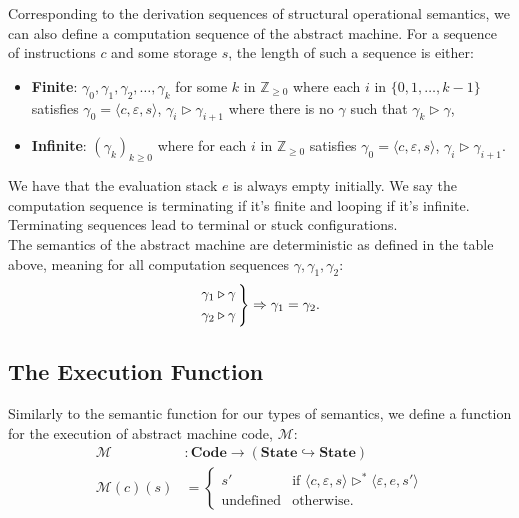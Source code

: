 Corresponding to the derivation sequences of structural operational semantics,
we can also define a computation sequence of the abstract machine. For a 
sequence of instructions $c$ and some storage $s$, the length of such a sequence 
is either: \begin{itemize}
  \item \textbf{Finite}: $\gamma_0, \gamma_1, \gamma_2, \ldots, \gamma_k$
  for some $k$ in $\mathbb{Z}_{\geq 0}$ where each $i$ in $\{0, 1, \ldots, k - 1\}$ satisfies
  $\gamma_0 = \langle c, \varepsilon, s \rangle$, $\gamma_i \triangleright \gamma_{i + 1}$ where
  there is no $\gamma$ such that $\gamma_k \triangleright \gamma$,
  \item \textbf{Infinite}: $(\gamma_k)_{k \geq 0}$ where 
  for each $i$ in $\mathbb{Z}_{\geq 0}$ satisfies 
  $\gamma_0 = \langle c, \varepsilon, s \rangle$, $\gamma_i \triangleright \gamma_{i + 1}$.
\end{itemize} We have that the evaluation stack $e$ is always empty
initially. We say the computation sequence is terminating if it's finite
and looping if it's infinite. Terminating sequences lead to terminal or stuck
configurations.
\\[\baselineskip]
The semantics of the abstract machine are deterministic as defined
in the table above, meaning for all
computation sequences $\gamma, \gamma_1, \gamma_2$: \begin{gather*}
  \begin{rcases*}
    \gamma_1 \triangleright \gamma \, \\
    \gamma_2 \triangleright \gamma \,
  \end{rcases*} \Rightarrow \gamma_1 = \gamma_2.
\end{gather*}

\subsection{The Execution Function}

Similarly to the semantic function for our types of semantics,
we define a function for the execution of abstract machine code, 
$\mathcal{M}$: \begin{align*}
  \mathcal{M} &: \textbf{Code} \to (\textbf{State} \hookrightarrow \textbf{State}) \\
  \mathcal{M}(c)(s) &= \begin{cases}
    s' & \text{if } \langle c, \varepsilon, s \rangle \triangleright^* \langle \varepsilon, e, s' \rangle\\
    \text{undefined} & \text{otherwise.}
  \end{cases}
\end{align*}

